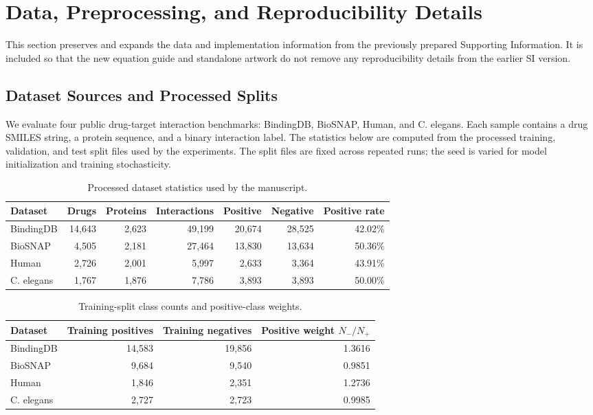 \section{Data, Preprocessing, and Reproducibility Details}
\label{si:legacy_details}

This section preserves and expands the data and implementation information from
the previously prepared Supporting Information. It is included so that the new
equation guide and standalone artwork do not remove any reproducibility details
from the earlier SI version.

\subsection{Dataset Sources and Processed Splits}

We evaluate four public drug-target interaction benchmarks: BindingDB,
BioSNAP, Human, and C. elegans. Each sample contains a drug SMILES string, a
protein sequence, and a binary interaction label. The statistics below are
computed from the processed training, validation, and test split files used by
the experiments. The split files are fixed across repeated runs; the seed is
varied for model initialization and training stochasticity.

\begin{table}[!htbp]
\centering
\caption{Processed dataset statistics used by the manuscript.}
\label{tab:si_processed_dataset_stats}
\begin{tabular}{lrrrrrr}
\toprule
Dataset & Drugs & Proteins & Interactions & Positive & Negative & Positive rate \\
\midrule
BindingDB & 14,643 & 2,623 & 49,199 & 20,674 & 28,525 & 42.02\% \\
BioSNAP & 4,505 & 2,181 & 27,464 & 13,830 & 13,634 & 50.36\% \\
Human & 2,726 & 2,001 & 5,997 & 2,633 & 3,364 & 43.91\% \\
C. elegans & 1,767 & 1,876 & 7,786 & 3,893 & 3,893 & 50.00\% \\
\bottomrule
\end{tabular}
\end{table}

\begin{table}[!htbp]
\centering
\caption{Training-split class counts and positive-class weights.}
\label{tab:si_training_weights}
\begin{tabular}{lrrr}
\toprule
Dataset & Training positives & Training negatives & Positive weight $N_-/N_+$ \\
\midrule
BindingDB & 14,583 & 19,856 & 1.3616 \\
BioSNAP & 9,684 & 9,540 & 0.9851 \\
Human & 1,846 & 2,351 & 1.2736 \\
C. elegans & 2,727 & 2,723 & 0.9985 \\
\bottomrule
\end{tabular}
\end{table}

